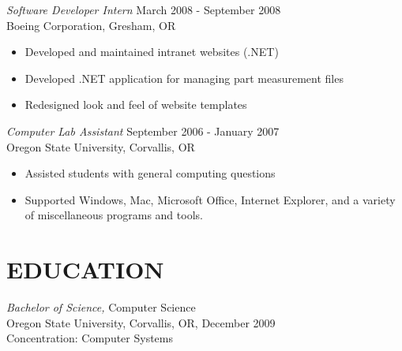\documentclass[margin]{res}
\begin{document}
\begin{resume}
                {\sl Software Developer Intern} \hfill         March 2008 - September 2008\\
                Boeing Corporation, Gresham, OR
                   \begin{itemize}  \itemsep -2pt %
                    \item Developed and maintained intranet websites (.NET)
                    \item Developed .NET application for managing part measurement files
                    \item Redesigned look and feel of website templates
                   \end{itemize}

                {\sl Computer Lab Assistant} \hfill         September 2006 - January 2007\\
                Oregon State University, Corvallis, OR
                \begin{itemize}  \itemsep -2pt %
                    \item Assisted students with general computing questions
                    \item Supported Windows, Mac, Microsoft Office, Internet Explorer, and a variety
                        of miscellaneous programs and tools.
                \end{itemize}


\section{EDUCATION} {\sl Bachelor of Science,} Computer Science \\
                Oregon State University, Corvallis, OR,
                December 2009 \\
                Concentration: Computer Systems


\end{resume}
\end{document}
